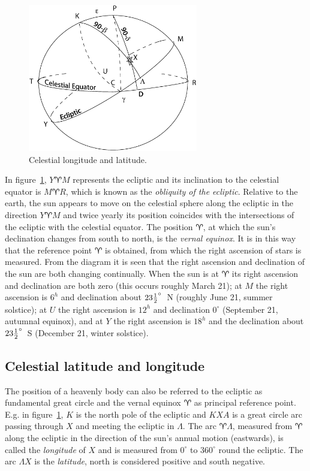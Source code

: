 \begin{figure}[h]
	\centering
	\includegraphics[width=0.66\textwidth]{ecliptic.eps}
	\caption{Celestial longitude and latitude.}
	\label{fig:ecliptic}
\end{figure}

In figure~\ref{fig:ecliptic}, $Y\aries M$ represents the ecliptic and
its inclination to the celestial equator is $M\aries R$, which is
known as the {\it obliquity of the ecliptic}. Relative to the earth,
the sun appears to move on the celestial sphere along the ecliptic in
the direction $Y\aries M$ and twice yearly its position coincides
with the intersections of the ecliptic with the celestial equator. The
position $\aries$, at which the sun's declination changes from south
to north, is the {\it vernal equinox}. It is in this way that the
reference point $\aries$ is obtained, from which the right ascension
of stars is measured. From the diagram it is seen that the right
ascension and declination of the sun are both changing
continually. When the sun is at $\aries$ its right ascension and
declination are both zero (this occurs roughly March 21); at $M$ the
right ascension is $6^h$ and declination about $23 {1\over2}^\circ$~N
(roughly June 21, summer solstice); at $U$ the right ascension is
$12^h$ and declination $0^\circ$ (September 21, autumnal equinox),
and at $Y$ the right ascension is $18^h$ and the declination about $23
{1\over 2}^\circ$~S (December 21, winter solstice).

\subsection{Celestial latitude and longitude}

The position of a heavenly body can also be referred to the ecliptic
as fundamental great circle and the vernal equinox $\aries$ as principal
reference point. E.g. in figure~\ref{fig:ecliptic}, $K$ is the north pole
of the ecliptic and $KXA$ is a great circle arc passing through $X$
and meeting the ecliptic in $\Lambda$. The arc $\aries\Lambda$,
measured from $\aries$ along the ecliptic in the direction of the
sun's annual motion (eastwards), is called the {\it longitude} of $X$
and is measured from $0^\circ$ to $360^\circ$ round the ecliptic. The
arc $\Lambda X$ is the {\it latitude}, north is considered positive
and south negative. 


